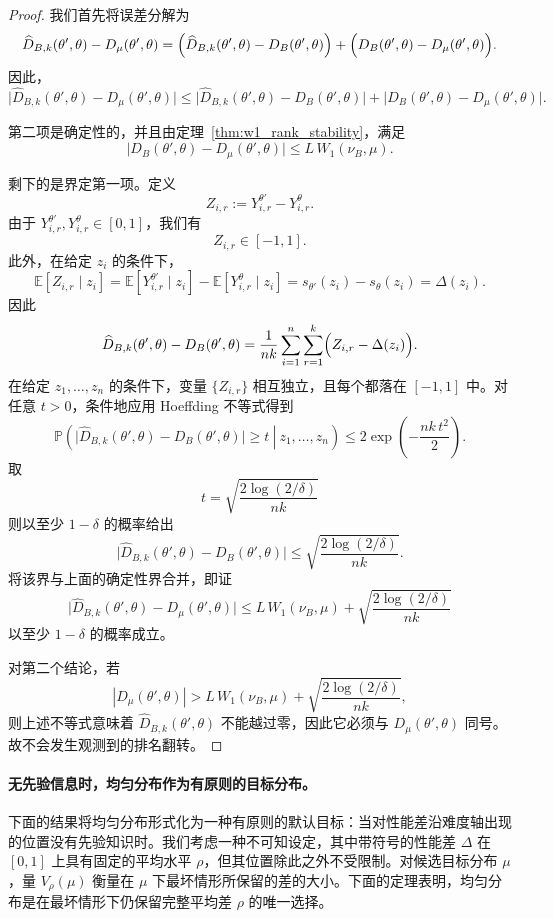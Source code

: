 \begin{proof}
我们首先将误差分解为
\[
\widehat{D}_{B,k}(\theta',\theta)-D_\mu(\theta',\theta)
=
\Bigl(\widehat{D}_{B,k}(\theta',\theta)-D_B(\theta',\theta)\Bigr)
+
\Bigl(D_B(\theta',\theta)-D_\mu(\theta',\theta)\Bigr).
\]
因此，
\[
\bigl|\widehat{D}_{B,k}(\theta',\theta)-D_\mu(\theta',\theta)\bigr|
\le
\bigl|\widehat{D}_{B,k}(\theta',\theta)-D_B(\theta',\theta)\bigr|
+
\bigl|D_B(\theta',\theta)-D_\mu(\theta',\theta)\bigr|.
\]

第二项是确定性的，并且由定理~\ref{thm:w1_rank_stability}，满足
\[
\bigl|D_B(\theta',\theta)-D_\mu(\theta',\theta)\bigr|
\le
L\,W_1(\nu_B,\mu).
\]

剩下的是界定第一项。定义
\[
Z_{i,r}
:=
Y_{i,r}^{\theta'}-Y_{i,r}^{\theta}.
\]
由于 $Y_{i,r}^{\theta'}, Y_{i,r}^{\theta}\in[0,1]$，我们有
\[
Z_{i,r}\in[-1,1].
\]
此外，在给定 $z_i$ 的条件下，
\[
\mathbb{E}[Z_{i,r}\mid z_i]
=
\mathbb{E}[Y_{i,r}^{\theta'}\mid z_i]
-
\mathbb{E}[Y_{i,r}^{\theta}\mid z_i]
=
s_{\theta'}(z_i)-s_\theta(z_i)
=
\Delta(z_i).
\]
因此
\[
\widehat{D}_{B,k}(\theta',\theta)-D_B(\theta',\theta)
=
\frac{1}{nk}\sum_{i=1}^n \sum_{r=1}^k \Bigl(Z_{i,r}-\Delta(z_i)\Bigr).
\]
在给定 $z_1,\dots,z_n$ 的条件下，变量 $\{Z_{i,r}\}$ 相互独立，且每个都落在 $[-1,1]$ 中。对任意 $t>0$，条件地应用 Hoeffding 不等式得到
\[
\mathbb{P}\!\left(
\left.
\bigl|\widehat{D}_{B,k}(\theta',\theta)-D_B(\theta',\theta)\bigr|
\ge t
\ \right|\ z_1,\dots,z_n
\right)
\le
2\exp\!\left(-\frac{nk\,t^2}{2}\right).
\]
取
\[
t=\sqrt{\frac{2\log(2/\delta)}{nk}}
\]
则以至少 $1-\delta$ 的概率给出
\[
\bigl|\widehat{D}_{B,k}(\theta',\theta)-D_B(\theta',\theta)\bigr|
\le
\sqrt{\frac{2\log(2/\delta)}{nk}}.
\]
将该界与上面的确定性界合并，即证
\[
\bigl|\widehat{D}_{B,k}(\theta',\theta)-D_\mu(\theta',\theta)\bigr|
\le
L\,W_1(\nu_B,\mu)
+
\sqrt{\frac{2\log(2/\delta)}{nk}}
\]
以至少 $1-\delta$ 的概率成立。

对第二个结论，若
\[
|D_\mu(\theta',\theta)|
>
L\,W_1(\nu_B,\mu)
+
\sqrt{\frac{2\log(2/\delta)}{nk}},
\]
则上述不等式意味着 $\widehat{D}_{B,k}(\theta',\theta)$ 不能越过零，因此它必须与 $D_\mu(\theta',\theta)$ 同号。故不会发生观测到的排名翻转。
\end{proof}

\paragraph{无先验信息时，均匀分布作为有原则的目标分布。}

下面的结果将均匀分布形式化为一种有原则的默认目标：当对性能差沿难度轴出现的位置没有先验知识时。我们考虑一种不可知设定，其中带符号的性能差 $\Delta$ 在 $[0,1]$ 上具有固定的平均水平 $\rho$，但其位置除此之外不受限制。对候选目标分布 $\mu$，量 $V_\rho(\mu)$ 衡量在 $\mu$ 下最坏情形所保留的差的大小。下面的定理表明，均匀分布是在最坏情形下仍保留完整平均差 $\rho$ 的唯一选择。

